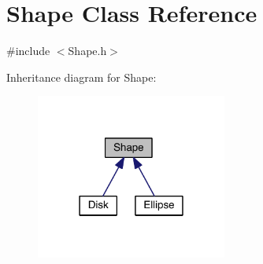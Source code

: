 \hypertarget{class_shape}{}\section{Shape Class Reference}
\label{class_shape}


{\ttfamily \#include $<$Shape.\+h$>$}



Inheritance diagram for Shape\+:\nopagebreak
\begin{figure}[H]
\begin{center}
\leavevmode
\includegraphics[width=178pt]{d6/ddd/class_shape__inherit__graph}
\end{center}
\end{figure}
